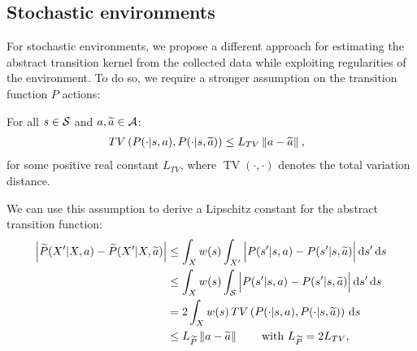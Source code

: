 \subsection{Stochastic environments}\label{sec:app2.3}
For stochastic environments, we propose a different approach for estimating the abstract transition kernel from the collected data while exploiting regularities of the environment. To do so, we require a stronger assumption on the transition function $P$ \wrt actions:
%
\begin{assumption}\label{ass:lipmdp2}
	For all $s\in\mathcal{S}$ and $a,\widetilde{a}\in\mathcal{A}$:
	\begin{align}
	&\mathop{TV}\left(P(\cdot|s,a), P(\cdot| s,\widetilde{a})\right) \leq L_{TV}\left\|a - \widetilde{a}\right\|_{},
	\end{align}
	for some positive real constant $L_{TV}$, where $\mathop{TV}(\cdot,\cdot)$ denotes the total variation distance. 
\end{assumption}
%
\noindent We can use this assumption to derive a Lipschitz constant for the abstract transition function:
\begin{align}
\Big|\widetilde{P}(X'|X,a) - \widetilde{P}(X'|X,\widetilde{a})\Big| &\leq \int_{X} w(s) \int_{X'} \Big|P(s'|s,a) - P(s'|s,\widetilde{a})\Big| \,\mathrm{d} s' \,\mathrm{d} s \nonumber\\
&\leq \int_{X}w(s)\int_{\mathcal{S}} \Big|P(s'|s,a) - P(s'|s,\widetilde{a})\Big| \,\mathrm{d} s' \,\mathrm{d} s \label{p:24} \\
&= 2\int_{X}w(s)\mathop{TV}\left(P(\cdot|s,a), P(\cdot|s,\widetilde{a})\right)\,\mathrm{d} s\label{p:33}\\
&\leq L_{\widetilde{P}}\left\|a-\widetilde{a}\right\|_{}\qquad\text{with $L_{\widetilde{P}}=2L_{TV}$}\label{p:27},
\end{align}
